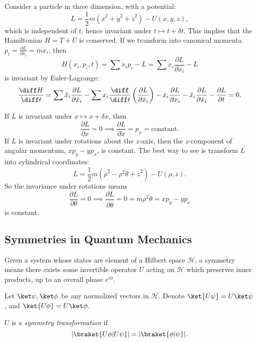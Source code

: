 \documentclass[12pt]{article}
\begin{document}
\begin{exbox}
	Consider a particle in three dimension, with a potential:
	\[
	L = \frac{1}{2} m (\dot x^2 + \dot y^2 + \dot z^2) - U(x, y, z),
	\]
	which is independent of $t$, hence invariant under $t \mapsto t + \delta t$. This implies that the Hamiltonian $H = T + U$ is conserved. If we transform into canonical momenta $p_i = \frac{\partial L}{\partial \dot x_i} = m \dot x_i$, then
	\[
	H(x_i, p_i, t) = \sum \dot x_i p_i - L = \sum \dot x_i \frac{\partial L}{\partial \dot x_i} - L
	\]
	is invariant by Euler-Lagrange:
	\[
	\frac{\diff H}{\diff t} = \sum \ddot x_i \frac{\partial L}{\partial \dot x_i} - \sum x_i \frac{\diff}{\diff t} \left( \frac{\partial L}{ \partial \dot x_i} \right) - \dot x_i \frac{\partial L}{\partial x_i} - \ddot x_i \frac{\partial L}{\partial \dot x_i} - \frac{\partial L}{\partial t} = 0.
	\]

	If $L$ is invariant under $x \mapsto x + \delta x$, then
	\[
		\frac{\partial L}{\partial x} = 0 \implies \frac{\partial L}{\partial \dot x} = p_x = \text{constant}.
	\]
	If $L$ is invariant under rotations about the $z$-axis, then the $z$-component of angular momentum, $xp_y - yp_x$, is constant. The best way to see is transform $L$ into cylindrical coordinates:
	\[
	L = \frac{1}{2} m (\dot \rho^2 - \rho^2 \dot \theta + \dot z^2) - U(\rho, z).
	\]
	So the invariance under rotations means
	\[
	\frac{\partial L}{\partial \theta} = 0 \implies \frac{\partial L}{\partial \dot \theta} = 0 = m \rho^2 \dot \theta = xp_y - yp_x
	\]
	is constant.
\end{exbox}

\subsection{Symmetries in Quantum Mechanics}%
\label{sub:sym_qm}

Given a system whose states are element of a Hilbert space $\mathcal{H}$, a symmetry means there exists some invertible operator $U$ acting on $\mathcal{H}$ which preserves inner products, up to an overall phase $e^{i\phi}$.

\begin{definition}
	Let $\ket \psi, \ket \phi$ be any normalized vectors in $\mathcal{H}$. Denote $\ket{U \psi} = U \ket \psi$, and $\ket{U \phi} = U \ket \phi$.

	$U$ is a \emph{symmetry transformation} if
	\[
		|\braket{U\phi | U \psi}| = |\braket{\phi|\psi}|.
	\]
\end{definition}
\end{document}
